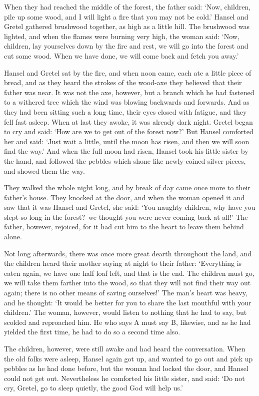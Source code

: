 \documentclass[oneside,11pt]{memoir} %
\begin{document}
When they had reached the middle of the forest, the father said: `Now, children, pile up some wood, and I will light a fire that you may not be cold.' Hansel and Gretel gathered brushwood together, as high as a little hill. The brushwood was lighted, and when the flames were burning very high, the woman said: `Now, children, lay yourselves down by the fire and rest, we will go into the forest and cut some wood. When we have done, we will come back and fetch you away.'

Hansel and Gretel sat by the fire, and when noon came, each ate a little piece of bread, and as they heard the strokes of the wood-axe they believed that their father was near. It was not the axe, however, but a branch which he had fastened to a withered tree which the wind was blowing backwards and forwards. And as they had been sitting such a long time, their eyes closed with fatigue, and they fell fast asleep. When at last they awoke, it was already dark night. Gretel began to cry and said: `How are we to get out of the forest now?' But Hansel comforted her and said: `Just wait a little, until the moon has risen, and then we will soon find the way.' And when the full moon had risen, Hansel took his little sister by the hand, and followed the pebbles which shone like newly-coined silver pieces, and showed them the way.

They walked the whole night long, and by break of day came once more to their father's house. They knocked at the door, and when the woman opened it and saw that it was Hansel and Gretel, she said: `You naughty children, why have you slept so long in the forest?--we thought you were never coming back at all!' The father, however, rejoiced, for it had cut him to the heart to leave them behind alone.

Not long afterwards, there was once more great dearth throughout the land, and the children heard their mother saying at night to their father: `Everything is eaten again, we have one half loaf left, and that is the end. The children must go, we will take them farther into the wood, so that they will not find their way out again; there is no other means of saving ourselves!' The man's heart was heavy, and he thought: `It would be better for you to share the last mouthful with your children.' The woman, however, would listen to nothing that he had to say, but scolded and reproached him. He who says A must say B, likewise, and as he had yielded the first time, he had to do so a second time also.

The children, however, were still awake and had heard the conversation. When the old folks were asleep, Hansel again got up, and wanted to go out and pick up pebbles as he had done before, but the woman had locked the door, and Hansel could not get out. Nevertheless he comforted his little sister, and said: `Do not cry, Gretel, go to sleep quietly, the good God will help us.'
\end{document}
